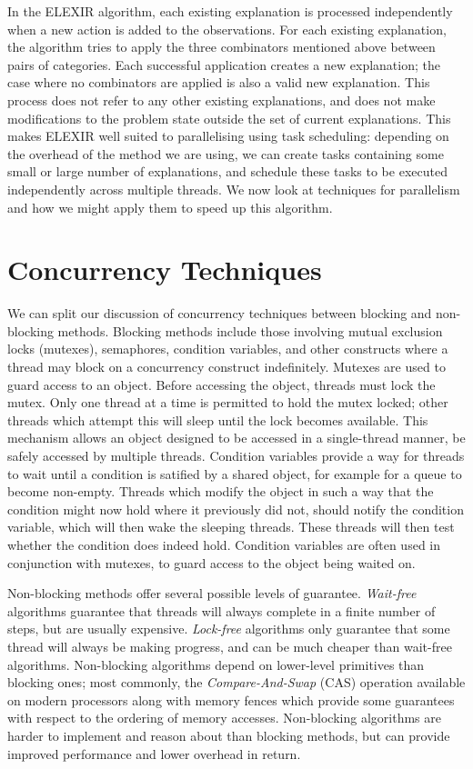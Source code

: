 In the ELEXIR algorithm, each existing explanation is processed independently when a new action is added to the observations. For each existing explanation, the algorithm tries to apply the three combinators mentioned above between pairs of categories. Each successful application creates a new explanation; the case where no combinators are applied is also a valid new explanation. This process does not refer to any other existing explanations, and does not make modifications to the problem state outside the set of current explanations. This makes ELEXIR well suited to parallelising using task scheduling: depending on the overhead of the method we are using, we can create tasks containing some small or large number of explanations, and schedule these tasks to be executed independently across multiple threads. We now look at techniques for parallelism and how we might apply them to speed up this algorithm.

\section{Concurrency Techniques}

We can split our discussion of concurrency techniques between blocking and non-blocking methods. Blocking methods include those involving mutual exclusion locks (mutexes), semaphores, condition variables, and other constructs where a thread may block on a concurrency construct indefinitely. Mutexes are used to guard access to an object. Before accessing the object, threads must lock the mutex. Only one thread at a time is permitted to hold the mutex locked; other threads which attempt this will sleep until the lock becomes available.
This mechanism allows an object designed to be accessed in a single-thread manner, be safely accessed by multiple threads. Condition variables provide a way for threads to wait until a condition is satified by a shared object, for example for a queue to become non-empty. Threads which modify the object in such a way that the condition might now hold where it previously did not, should notify the condition variable, which will then wake the sleeping threads. These threads will 
then test whether the condition does indeed hold. Condition variables are often used in conjunction with mutexes, to guard access to the object being waited on.

Non-blocking methods offer several possible levels of guarantee. \emph{Wait-free} algorithms guarantee that threads will always complete in a finite number of steps, but are usually expensive. \emph{Lock-free} algorithms only guarantee that some thread will always be making progress, and can be much cheaper than wait-free algorithms. Non-blocking algorithms depend on lower-level primitives than blocking ones; most commonly, the \emph{Compare-And-Swap} (CAS) operation available on modern processors along with memory fences which provide some guarantees with respect to the ordering of memory accesses. Non-blocking algorithms are harder to implement and reason about than blocking methods, but can provide improved performance and lower overhead in return.

